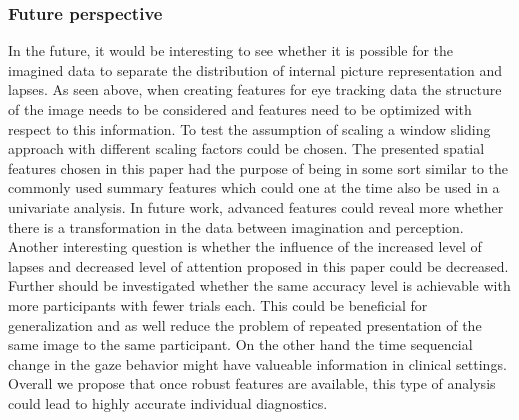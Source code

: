 \documentclass[a4paper,man,natbib,floatsintext]{apa6}
\begin{document}
\subsubsection{Future perspective}
In the future, it would be interesting to see whether it is possible for the imagined data to separate the distribution of internal picture representation and lapses.  As seen above, when creating features for eye tracking data the structure of the image needs to be considered and features need to be optimized with respect to this information. To test the assumption of scaling a window sliding approach with different scaling factors could be chosen. 
The presented spatial features chosen in this paper had the purpose of being in some sort similar to the commonly used summary features which could one at the time also be used in a univariate analysis. In future work, advanced features could reveal more whether there is a transformation in the data between imagination and perception. Another interesting question is whether the influence of the increased level of lapses and decreased level of attention proposed in this paper could be decreased.\\
Further should be investigated whether the same accuracy level is achievable with more participants with fewer trials each. This could be beneficial for generalization and as well reduce the problem of repeated presentation of the same image to the same participant. On the other hand the time sequencial change in the gaze behavior might have valueable information in clinical settings.  Overall we propose that once robust features are available, this type of analysis could lead to highly accurate individual diagnostics.

\clearpage
 

 
\newpage
\clearpage
\end{document}
